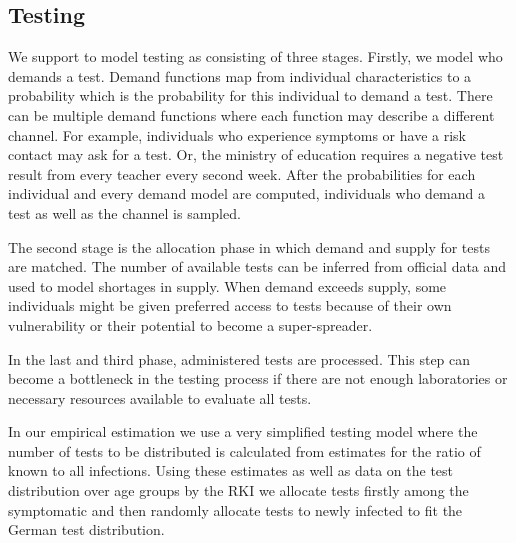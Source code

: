 \subsection{Testing} %
\label{sub:testing}

We support to model testing as consisting of three stages.
Firstly, we model who demands a test. Demand functions map from individual
characteristics to a probability which is the probability for this individual to demand
a test. There can be multiple demand functions where each function may describe a
different channel. For example, individuals who experience symptoms or have a risk
contact may ask for a test. Or, the ministry of education requires a negative test
result from every teacher every second week. After the probabilities for each individual
and every demand model are computed, individuals who demand a test as well as the
channel is sampled.

The second stage is the allocation phase in which demand and supply for tests are
matched. The number of available tests can be inferred from official data and used to
model shortages in supply. When demand exceeds supply, some individuals might be given
preferred access to tests because of their own vulnerability or their potential to
become a super-spreader.

In the last and third phase, administered tests are processed.
This step can become a bottleneck in the testing process if there are not enough
laboratories or necessary resources available to evaluate all tests.

In our empirical estimation we use a very simplified testing model where the number
of tests to be distributed is calculated from estimates for the ratio of known to all
infections.\footnotemark
{}
Using these estimates as well as data on the test distribution
over age groups by the RKI\footnotemark
{}
we allocate tests firstly among the symptomatic
and then randomly allocate tests to newly infected to fit the German test distribution.


